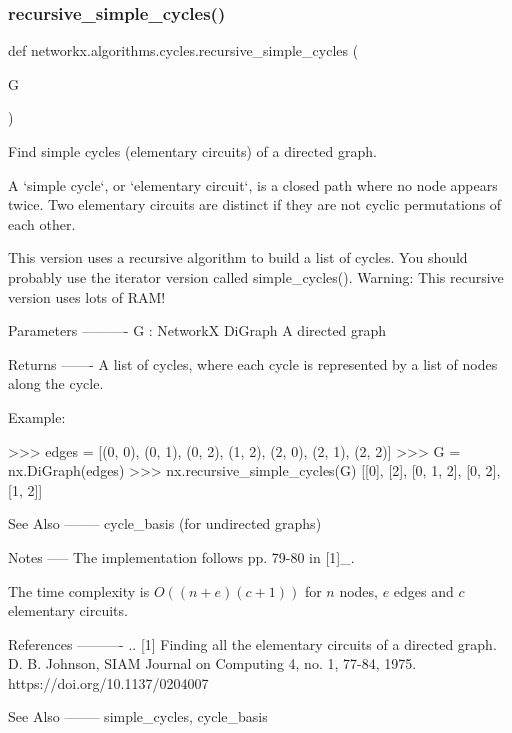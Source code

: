 \subsubsection{\texorpdfstring{recursive\+\_\+simple\+\_\+cycles()}{recursive\_simple\_cycles()}}
{\footnotesize\ttfamily def networkx.\+algorithms.\+cycles.\+recursive\+\_\+simple\+\_\+cycles (\begin{DoxyParamCaption}\item[{}]{G }\end{DoxyParamCaption})}

\begin{DoxyVerb}Find simple cycles (elementary circuits) of a directed graph.

A `simple cycle`, or `elementary circuit`, is a closed path where
no node appears twice. Two elementary circuits are distinct if they
are not cyclic permutations of each other.

This version uses a recursive algorithm to build a list of cycles.
You should probably use the iterator version called simple_cycles().
Warning: This recursive version uses lots of RAM!

Parameters
----------
G : NetworkX DiGraph
   A directed graph

Returns
-------
A list of cycles, where each cycle is represented by a list of nodes
along the cycle.

Example:

>>> edges = [(0, 0), (0, 1), (0, 2), (1, 2), (2, 0), (2, 1), (2, 2)]
>>> G = nx.DiGraph(edges)
>>> nx.recursive_simple_cycles(G)
[[0], [2], [0, 1, 2], [0, 2], [1, 2]]

See Also
--------
cycle_basis (for undirected graphs)

Notes
-----
The implementation follows pp. 79-80 in [1]_.

The time complexity is $O((n+e)(c+1))$ for $n$ nodes, $e$ edges and $c$
elementary circuits.

References
----------
.. [1] Finding all the elementary circuits of a directed graph.
   D. B. Johnson, SIAM Journal on Computing 4, no. 1, 77-84, 1975.
   https://doi.org/10.1137/0204007

See Also
--------
simple_cycles, cycle_basis
\end{DoxyVerb}
 \mbox{\label{namespacenetworkx_1_1algorithms_1_1cycles_a24027fc741f4f11cef8f92482a159943}} 
